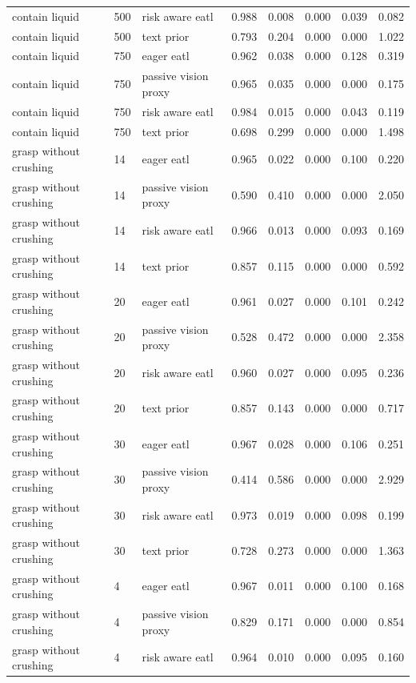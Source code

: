 \begin{longtable}{lllrrrrr}
contain liquid & 500 & risk aware eatl & 0.988 & 0.008 & 0.000 & 0.039 & 0.082 \\
contain liquid & 500 & text prior & 0.793 & 0.204 & 0.000 & 0.000 & 1.022 \\
contain liquid & 750 & eager eatl & 0.962 & 0.038 & 0.000 & 0.128 & 0.319 \\
contain liquid & 750 & passive vision proxy & 0.965 & 0.035 & 0.000 & 0.000 & 0.175 \\
contain liquid & 750 & risk aware eatl & 0.984 & 0.015 & 0.000 & 0.043 & 0.119 \\
contain liquid & 750 & text prior & 0.698 & 0.299 & 0.000 & 0.000 & 1.498 \\
grasp without crushing & 14 & eager eatl & 0.965 & 0.022 & 0.000 & 0.100 & 0.220 \\
grasp without crushing & 14 & passive vision proxy & 0.590 & 0.410 & 0.000 & 0.000 & 2.050 \\
grasp without crushing & 14 & risk aware eatl & 0.966 & 0.013 & 0.000 & 0.093 & 0.169 \\
grasp without crushing & 14 & text prior & 0.857 & 0.115 & 0.000 & 0.000 & 0.592 \\
grasp without crushing & 20 & eager eatl & 0.961 & 0.027 & 0.000 & 0.101 & 0.242 \\
grasp without crushing & 20 & passive vision proxy & 0.528 & 0.472 & 0.000 & 0.000 & 2.358 \\
grasp without crushing & 20 & risk aware eatl & 0.960 & 0.027 & 0.000 & 0.095 & 0.236 \\
grasp without crushing & 20 & text prior & 0.857 & 0.143 & 0.000 & 0.000 & 0.717 \\
grasp without crushing & 30 & eager eatl & 0.967 & 0.028 & 0.000 & 0.106 & 0.251 \\
grasp without crushing & 30 & passive vision proxy & 0.414 & 0.586 & 0.000 & 0.000 & 2.929 \\
grasp without crushing & 30 & risk aware eatl & 0.973 & 0.019 & 0.000 & 0.098 & 0.199 \\
grasp without crushing & 30 & text prior & 0.728 & 0.273 & 0.000 & 0.000 & 1.363 \\
grasp without crushing & 4 & eager eatl & 0.967 & 0.011 & 0.000 & 0.100 & 0.168 \\
grasp without crushing & 4 & passive vision proxy & 0.829 & 0.171 & 0.000 & 0.000 & 0.854 \\
grasp without crushing & 4 & risk aware eatl & 0.964 & 0.010 & 0.000 & 0.095 & 0.160 \\

\end{longtable}

